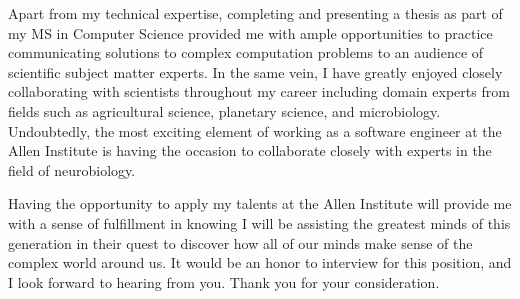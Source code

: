 Apart from my technical expertise, completing and presenting a thesis as part of my MS in Computer Science provided me with ample opportunities to practice communicating solutions to complex computation problems to an audience of scientific subject matter experts.
In the same vein, I have greatly enjoyed closely collaborating with scientists throughout my career including domain experts from fields such as agricultural science, planetary science, and microbiology.
Undoubtedly, the most exciting element of working as a software engineer at the Allen Institute is having the occasion to collaborate closely with experts in the field of neurobiology.

Having the opportunity to apply my talents at the Allen Institute will provide me with a sense of fulfillment in knowing I will be assisting the greatest minds of this generation in their quest to discover how all of our minds make sense of the complex world around us.
It would be an honor to interview for this position, and I look forward to hearing  from you.
Thank you for your consideration.